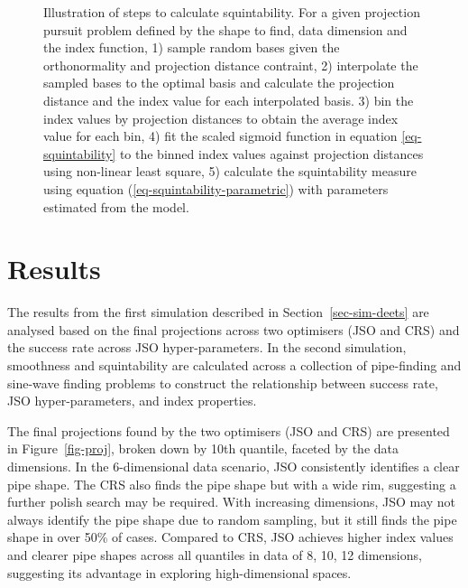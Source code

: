 \documentclass[
  12pt,
]{interact}
\theoremstyle{plain}
\begin{document}
\begin{figure}


\caption{\label{fig-squintability}Illustration of steps to calculate
squintability. For a given projection pursuit problem defined by the
shape to find, data dimension and the index function, 1) sample random
bases given the orthonormality and projection distance contraint, 2)
interpolate the sampled bases to the optimal basis and calculate the
projection distance and the index value for each interpolated basis. 3)
bin the index values by projection distances to obtain the average index
value for each bin, 4) fit the scaled sigmoid function in equation
\eqref{eq-squintability} to the binned index values against projection
distances using non-linear least square, 5) calculate the squintability
measure using equation (\ref{eq-squintability-parametric}) with
parameters estimated from the model.}

\end{figure}%

\section{Results}\label{sec-sim-res}

The results from the first simulation described in
Section~\ref{sec-sim-deets} are analysed based on the final projections
across two optimisers (JSO and CRS) and the success rate across JSO
hyper-parameters. In the second simulation, smoothness and squintability
are calculated across a collection of pipe-finding and sine-wave finding
problems to construct the relationship between success rate, JSO
hyper-parameters, and index properties.

The final projections found by the two optimisers (JSO and CRS) are
presented in Figure~\ref{fig-proj}, broken down by 10th quantile,
faceted by the data dimensions. In the 6-dimensional data scenario, JSO
consistently identifies a clear pipe shape. The CRS also finds the pipe
shape but with a wide rim, suggesting a further polish search may be
required. With increasing dimensions, JSO may not always identify the
pipe shape due to random sampling, but it still finds the pipe shape in
over 50\% of cases. Compared to CRS, JSO achieves higher index values
and clearer pipe shapes across all quantiles in data of 8, 10, 12
dimensions, suggesting its advantage in exploring high-dimensional
spaces.
\end{document}
